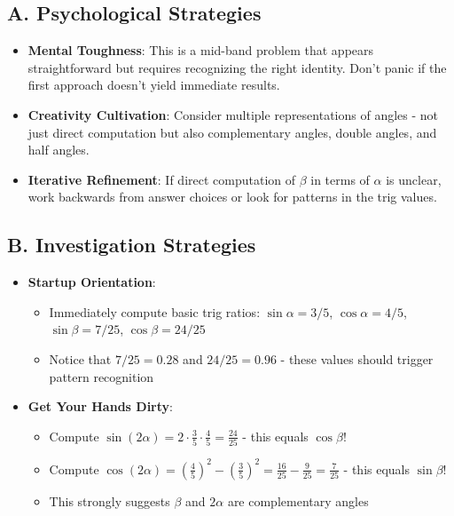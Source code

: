 \documentclass[11pt]{article}
\begin{document}
\begin{strategicbox}
\subsection*{A. Psychological Strategies}
\begin{itemize}[leftmargin=*]
    \item \textbf{Mental Toughness}: This is a mid-band problem that appears straightforward but requires recognizing the right identity. Don't panic if the first approach doesn't yield immediate results.
    
    \item \textbf{Creativity Cultivation}: Consider multiple representations of angles - not just direct computation but also complementary angles, double angles, and half angles.
    
    \item \textbf{Iterative Refinement}: If direct computation of $\beta$ in terms of $\alpha$ is unclear, work backwards from answer choices or look for patterns in the trig values.
\end{itemize}

\subsection*{B. Investigation Strategies}
\begin{itemize}[leftmargin=*]
    \item \textbf{Startup Orientation}: 
    \begin{itemize}
        \item Immediately compute basic trig ratios: $\sin\alpha = 3/5$, $\cos\alpha = 4/5$, $\sin\beta = 7/25$, $\cos\beta = 24/25$
        \item Notice that $7/25 = 0.28$ and $24/25 = 0.96$ - these values should trigger pattern recognition
    \end{itemize}
    
    \item \textbf{Get Your Hands Dirty}: 
    \begin{itemize}
        \item Compute $\sin(2\alpha) = 2 \cdot \frac{3}{5} \cdot \frac{4}{5} = \frac{24}{25}$ - this equals $\cos\beta$!
        \item Compute $\cos(2\alpha) = \left(\frac{4}{5}\right)^2 - \left(\frac{3}{5}\right)^2 = \frac{16}{25} - \frac{9}{25} = \frac{7}{25}$ - this equals $\sin\beta$!
        \item This strongly suggests $\beta$ and $2\alpha$ are complementary angles
    \end{itemize}
    

\end{itemize}
\end{strategicbox}
\end{document}
